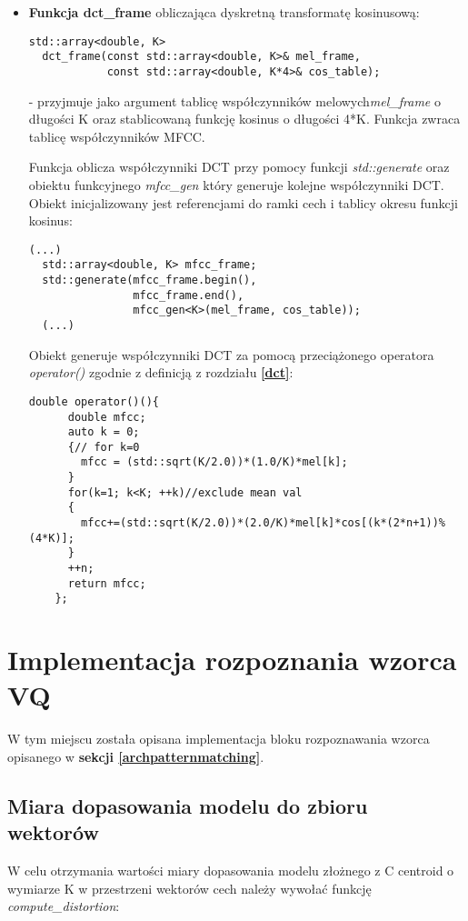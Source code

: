 \begin{itemize}
\item{\textbf{Funkcja dct\_frame} obliczająca dyskretną transformatę kosinusową:
 \begin{lstlisting}[style=lst:cpp]
  std::array<double, K>
  dct_frame(const std::array<double, K>& mel_frame,
            const std::array<double, K*4>& cos_table);
\end{lstlisting}
}
- przyjmuje jako argument tablicę współczynników melowych\textit{mel\_frame} o długości K oraz stablicowaną funkcję kosinus o długości 4*K. Funkcja zwraca tablicę współczynników MFCC.

  Funkcja oblicza współczynniki DCT przy pomocy funkcji \textit{std::generate} oraz obiektu funkcyjnego \textit{mfcc\_gen} który generuje kolejne współczynniki DCT. Obiekt inicjalizowany jest referencjami do ramki cech i tablicy okresu funkcji kosinus:
 \begin{lstlisting}[style=lst:cpp]
 (...)
  std::array<double, K> mfcc_frame;
  std::generate(mfcc_frame.begin(),
                mfcc_frame.end(),
                mfcc_gen<K>(mel_frame, cos_table));
  (...)
\end{lstlisting}

Obiekt generuje współczynniki DCT za pomocą przeciążonego operatora \textit{operator()} zgodnie z definicją z rozdziału \textbf{\ref{dct}}:
 \begin{lstlisting}[style=lst:cpp]
    double operator()(){
      double mfcc;
      auto k = 0;
      {// for k=0
        mfcc = (std::sqrt(K/2.0))*(1.0/K)*mel[k];
      }
      for(k=1; k<K; ++k)//exclude mean val
      {
        mfcc+=(std::sqrt(K/2.0))*(2.0/K)*mel[k]*cos[(k*(2*n+1))%(4*K)]; 
      }
      ++n;
      return mfcc; 
    };
 \end{lstlisting}
\end{itemize}

\section{Implementacja rozpoznania wzorca VQ}

W tym miejscu została opisana implementacja bloku rozpoznawania wzorca opisanego w \textbf{sekcji \ref{archpatternmatching}}.

\subsection{Miara dopasowania modelu do zbioru wektorów}

W celu otrzymania wartości miary dopasowania modelu złożnego z C centroid o wymiarze K w przestrzeni wektorów cech należy wywołać funkcję \textit{compute\_distortion}:


